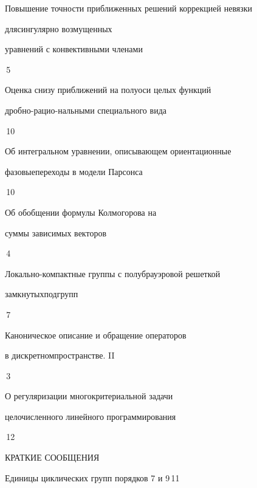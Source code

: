 

{Повышение точности приближенных решений коррекцией невязки


для\newline сингулярно возмущенных


уравнений с конвективными членами}{\No\,5}




{Оценка снизу приближений на полуоси целых функций 


дробно-рацио-\newline нальными специального вида}{\No\,10}




{Об интегральном уравнении, описывающем ориентационные 


фазовые\newline переходы в модели Парсонса}{\No\,10}




{Об обобщении формулы Колмогорова на 


суммы зависимых векторов}{\No\,4}




{Локально-компактные группы с полубрауэровой решеткой 


замкнутых\newline подгрупп}{\No\,7}




{Каноническое описание и обращение операторов 


в дискретном\newline пространстве. II}{\No\,3}




{О регуляризации многокритериальной задачи\newline


целочисленного линейного программирования}{\No\,12}





\bigskip


{\centerline {КРАТКИЕ СООБЩЕНИЯ}}


\bigskip







{Единицы циклических групп порядков 7 и 9}{\No\,11}





